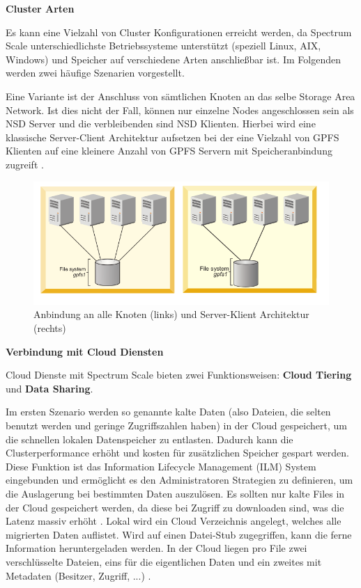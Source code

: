 \textbf{Cluster Arten}

Es kann eine Vielzahl von Cluster Konfigurationen erreicht werden, da Spectrum Scale unterschiedlichste Betriebssysteme unterstützt (speziell Linux, AIX, Windows) und Speicher auf verschiedene Arten anschließbar ist. Im Folgenden werden zwei häufige Szenarien vorgestellt.

Eine Variante ist der Anschluss von sämtlichen Knoten an das selbe Storage Area Network. Ist dies nicht der Fall, können nur einzelne Nodes angeschlossen sein als \ac{NSD} Server und die verbleibenden sind \ac{NSD} Klienten. Hierbei wird eine klassische Server-Client Architektur aufsetzen bei der eine Vielzahl von GPFS Klienten auf eine kleinere Anzahl von GPFS Servern mit Speicheranbindung zugreift \parencite[S. 8]{ibm.2017}.

\begin{figure}[hbt]
	\centering
	\includegraphics[scale=0.6]{images/gpfs-architectures}
	\caption{Anbindung an alle Knoten (links) und Server-Klient Architektur (rechts) \parencite[S. 8]{ibm.2017}}
	\label{fig:gpfsarchitecture}
\end{figure}

\textbf{Verbindung mit Cloud Diensten}

Cloud Dienste mit Spectrum Scale bieten zwei Funktionsweisen: \textbf{Cloud Tiering} und \textbf{Data Sharing}.

Im ersten Szenario werden so genannte kalte Daten (also Dateien, die selten benutzt werden und geringe Zugriffszahlen haben) in der Cloud gespeichert, um die schnellen lokalen Datenspeicher zu entlasten. Dadurch kann die Clusterperformance erhöht und kosten für zusätzlichen Speicher gespart werden. Diese Funktion ist das Information Lifecycle Management (\ac{ILM}) System eingebunden und ermöglicht es den Administratoren Strategien zu definieren, um die Auslagerung bei bestimmten Daten auszulösen.
Es sollten nur kalte Files in der Cloud gespeichert werden, da diese bei Zugriff zu downloaden sind, was die Latenz massiv erhöht \parencite[S. 107]{ibm.2017}.
Lokal wird ein Cloud Verzeichnis angelegt, welches alle migrierten Daten auflistet. Wird auf einen Datei-Stub zugegriffen, kann die ferne Information heruntergeladen werden. In der Cloud liegen pro File zwei verschlüsselte Dateien, eins für die eigentlichen Daten und ein zweites mit Metadaten (Besitzer, Zugriff, ...) \parencite[S. 108]{ibm.2017}.

